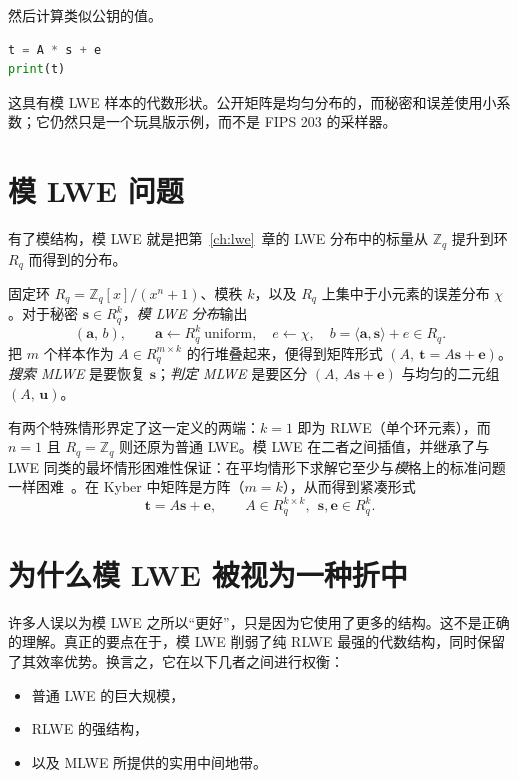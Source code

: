 然后计算类似公钥的值。

\begin{lstlisting}[language=Python]
t = A * s + e
print(t)
\end{lstlisting}

这具有模 LWE 样本的代数形状。公开矩阵是均匀分布的，而秘密和误差使用小系数；它仍然只是一个玩具版示例，而不是 FIPS 203 的采样器。

\section{模 LWE 问题}

有了模结构，模 LWE 就是把第~\ref{ch:lwe}~章的 LWE 分布中的标量从 $\mathbb{Z}_q$ 提升到环 $R_q$ 而得到的分布。

\begin{definition}[模 LWE]
固定环 $R_q=\mathbb{Z}_q[x]/(x^n+1)$、模秩 $k$，以及 $R_q$ 上集中于小元素的误差分布 $\chi$。对于秘密 $\mathbf{s}\in R_q^{k}$，\emph{模 LWE 分布}输出
\[
(\mathbf{a},\,b),\qquad \mathbf{a}\leftarrow R_q^{k}\ \text{uniform},\quad e\leftarrow\chi,\quad b=\langle \mathbf{a},\mathbf{s}\rangle + e\in R_q.
\]
把 $m$ 个样本作为 $A\in R_q^{m\times k}$ 的行堆叠起来，便得到矩阵形式 $(A,\ \mathbf{t}=A\mathbf{s}+\mathbf{e})$。\emph{搜索 MLWE} 是要恢复 $\mathbf{s}$；\emph{判定 MLWE} 是要区分 $(A,\,A\mathbf{s}+\mathbf{e})$ 与均匀的二元组 $(A,\,\mathbf{u})$。
\end{definition}

有两个特殊情形界定了这一定义的两端：$k=1$ 即为 RLWE（单个环元素），而 $n=1$ 且 $R_q=\mathbb{Z}_q$ 则还原为普通 LWE。模 LWE 在二者之间插值，并继承了与 LWE 同类的最坏情形困难性保证：在平均情形下求解它至少与\emph{模}格上的标准问题一样困难~\cite{langlois2015}。在 Kyber 中矩阵是方阵（$m=k$），从而得到紧凑形式
\[
\mathbf{t} = A\mathbf{s} + \mathbf{e}, \qquad A\in R_q^{k\times k},\ \ \mathbf{s},\mathbf{e}\in R_q^{k}.
\]

\section{为什么模 LWE 被视为一种折中}

许多人误以为模 LWE 之所以“更好”，只是因为它使用了更多的结构。这不是正确的理解。真正的要点在于，模 LWE 削弱了纯 RLWE 最强的代数结构，同时保留了其效率优势。换言之，它在以下几者之间进行权衡：

\begin{itemize}
    \item 普通 LWE 的巨大规模，
    \item RLWE 的强结构，
    \item 以及 MLWE 所提供的实用中间地带。
\end{itemize}

